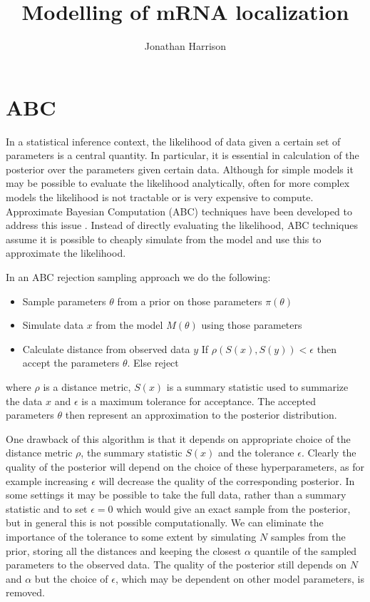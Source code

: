 \documentclass[a4paper,10pt]{article}
\title{Modelling of mRNA localization}
\author{Jonathan Harrison}
\begin{document}
\maketitle

\begin{abstract}

\end{abstract}

\section{ABC}

In a statistical inference context, the likelihood of data given a certain set of parameters is a central quantity. 
In particular, it is essential in calculation of the posterior over the parameters given certain data. 
Although for simple models it may be possible to evaluate the likelihood analytically, often for more complex models the likelihood is not tractable or is very expensive to compute.  
Approximate Bayesian Computation (ABC) techniques have been developed to address this issue \cite{beaumont2002}.
Instead of directly evaluating the likelihood, ABC techniques assume it is possible to cheaply simulate from the model and use this to approximate the likelihood.

In an ABC rejection sampling approach we do the following:
\begin{itemize}
\item Sample parameters $\theta$ from a prior on those parameters $\pi (\theta)$ \\
\item Simulate data $x$ from the model $M(\theta)$ using those parameters \\
\item Calculate distance from observed data $y$ If $\rho (S(x),S(y)) < \epsilon $ then accept the parameters $\theta$. Else reject \\

\end{itemize}
where $\rho$ is a distance metric, $S(x)$ is a summary statistic used to summarize the data $x$ and $\epsilon$ is a maximum tolerance for acceptance. 
The accepted parameters $\theta$ then represent an approximation to the posterior distribution. 

One drawback of this algorithm is that it depends on appropriate choice of the distance metric $\rho$, the summary statistic $S(x)$ and the tolerance $\epsilon $. 
Clearly the quality of the posterior will depend on the choice of these hyperparameters, as for example increasing $\epsilon $ will decrease the quality of the corresponding posterior.
In some settings it may be possible to take the full data, rather than a summary statistic and to set $\epsilon=0$ which would give an exact sample from the posterior, but in general this is not possible computationally. 
We can eliminate the importance of the tolerance to some extent by simulating $N$ samples from the prior, storing all the distances and keeping the closest $\alpha$ quantile of the sampled parameters to the observed data. 
The quality of the posterior still depends on $N$ and $\alpha$ but the choice of $\epsilon $, which may be dependent on other model parameters, is removed. 
\end{document}
